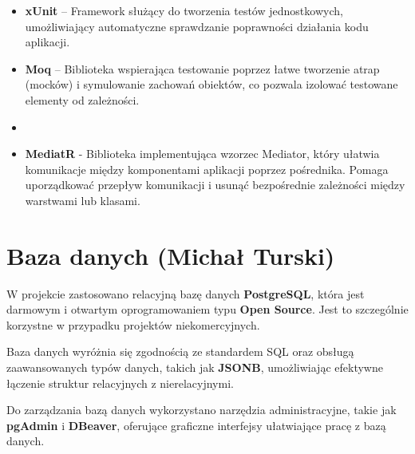 \begin{itemize}
    \item \textbf{xUnit} – Framework służący do tworzenia testów jednostkowych, umożliwiający automatyczne sprawdzanie poprawności działania kodu aplikacji.  
    
    \item \textbf{Moq} – Biblioteka wspierająca testowanie poprzez łatwe tworzenie atrap (mocków) i symulowanie zachowań obiektów, co pozwala izolować testowane elementy od zależności.
    \item 
    \item \textbf{MediatR} - Biblioteka implementująca wzorzec Mediator, który ułatwia komunikacje między komponentami aplikacji poprzez pośrednika. Pomaga uporządkować przepływ komunikacji i usunąć bezpośrednie zależności między warstwami lub klasami.

    
    
    
\end{itemize}


\section{Baza danych (Michał Turski)}

W projekcie zastosowano relacyjną bazę danych \textbf{PostgreSQL}, która jest darmowym i otwartym oprogramowaniem typu \textbf{Open Source}. Jest to szczególnie korzystne w przypadku projektów niekomercyjnych.

Baza danych wyróżnia się zgodnością ze standardem SQL oraz obsługą zaawansowanych typów danych, takich jak \textbf{JSONB}, umożliwiając efektywne łączenie struktur relacyjnych z nierelacyjnymi.

Do zarządzania bazą danych wykorzystano narzędzia administracyjne, takie jak \textbf{pgAdmin} i \textbf{DBeaver}, oferujące graficzne interfejsy ułatwiające pracę z bazą danych.
